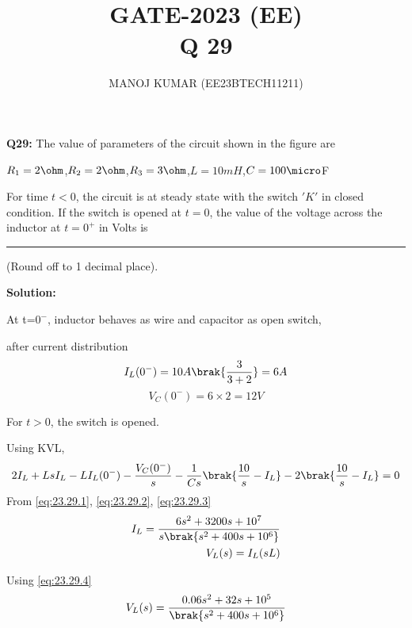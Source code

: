 \documentclass[journal,12pt,twocolumn]{IEEEtran}
\theoremstyle{remark}
\begin{document}

\vspace{3cm}

\title{GATE-2023 (EE) \\Q 29}
\author{MANOJ KUMAR (EE23BTECH11211)}
\maketitle
\newpage

\bigskip

\renewcommand{\thefigure}{\theenumi}
\renewcommand{\thetable}{\theenumi}
\textbf{Q29:}
 The value of parameters of the circuit shown in the figure are
 \begin{center}
 $R_1=2\ohm$,$R_2=2\ohm$,$R_3=3\ohm$,$L=10 mH$,$C=100\micro$F
 \end{center}
 For time \(t<0\), the circuit is at steady state with the switch $ 'K'$ in closed condition. If the switch is opened at $t=0$, the value of the voltage across the inductor 
 at $t=0^{+}$ in Volts is \rule{2cm}{0.4pt} (Round off to 1 decimal place). 


\textbf{Solution:}


At t=$0^-$, inductor behaves as wire and capacitor as open switch,


after current distribution
\begin{equation}
    I_L(0^-) = 10A\brak{\frac{3}{3+2}}=6 A\\
    \label{eq:23.29.1}
 \end{equation}  
 \begin{equation}
    V_C(0^-)= 6\times2= 12 V
     \label{eq:23.29.2}
\end{equation}

For $t>0$, the switch is opened.


Using KVL,\\
\begin{multline}
2I_L+LsI_L-LI_L(0^-)-\frac{V_C(0^-)}{s}-\frac{1}{Cs}\brak{\frac{10}{s}-I_L}-2\brak{\frac{10}{s}-I_L}=0
   \label{eq:23.29.3}
\end{multline}
From \eqref{eq:23.29.1}, \eqref{eq:23.29.2}, \eqref{eq:23.29.3}
\begin{align}
I_L=\frac{6s^2+3200s+10^7}{s\brak{s^2+400s+10^6}}
\label{eq:23.29.4}\\
V_L(s)=I_L(sL)
\end{align}

Using \eqref{eq:23.29.4}
\begin{align}
V_L(s)=\frac{0.06s^2+32s+10^5}{\brak{s^2+400s+10^6}}
\label{eq:23.29.6}
\end{align}
\end{document}
